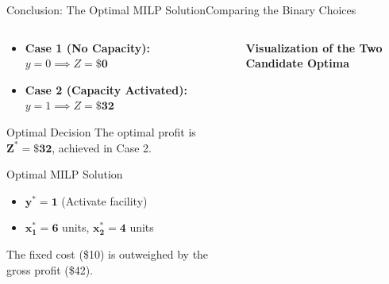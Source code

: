 \documentclass[aspectratio=169]{beamer}
\begin{document}
\begin{frame}{Conclusion: The Optimal MILP Solution}{Comparing the Binary Choices}
    \begin{columns}[T]
        \begin{column}{0.50\textwidth}
            \footnotesize
            \begin{itemize}
                \item \textbf{Case 1 (No Capacity):} $y=0 \implies Z = \mathbf{\$0}$
                \item \textbf{Case 2 (Capacity Activated):} $y=1 \implies Z = \mathbf{\$32}$
            \end{itemize}

            \begin{alertblock}{Optimal Decision}
                The optimal profit is $\mathbf{Z^* = \$32}$, achieved in Case 2.
            \end{alertblock}
            \begin{block}{Optimal MILP Solution}
                \begin{itemize}
                    \item $\mathbf{y^* = 1}$ (Activate facility)
                    \item $\mathbf{x_1^* = 6}$ units, $\mathbf{x_2^* = 4}$ units
                \end{itemize}
                The fixed cost (\$10) is outweighed by the gross profit (\$42).
            \end{block}
        \end{column}
        \begin{column}{0.47\textwidth}
            \centering
            \footnotesize \textbf{Visualization of the Two Candidate Optima}\\[2pt]
\end{column}
\end{columns}
\end{frame}
\end{document}

